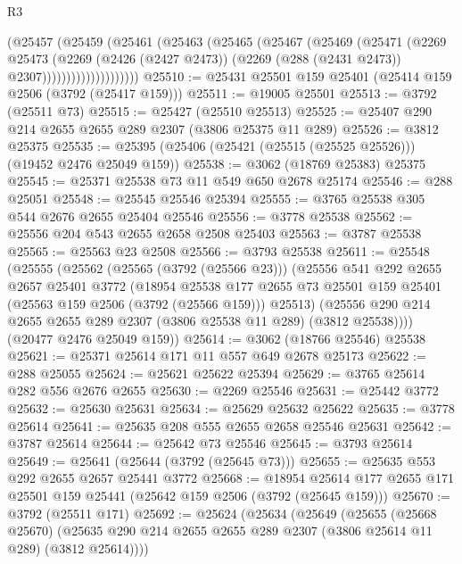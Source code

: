 \begin{lexlean}{R3}
\begin{coremodule}
                      (@25457
                        (@25459
                          (@25461
                            (@25463
                              (@25465
                                (@25467
                                  (@25469
                                    (@25471
                                      (@2269
                                        @25473
                                        (@2269
                                          (@2426 (@2427 @2473))
                                          (@2269 (@288 (@2431 @2473)) @2307))))))))))))))))))))
@25510 := @25431 @25501 @159 @25401 (@25414 @159 @2506 (@3792 (@25417 @159)))
@25511 := @19005 @25501
@25513 := @3792 (@25511 @73)
@25515 := @25427 (@25510 @25513)
@25525 := @25407 @290 @214 @2655 @2655 @289 @2307 (@3806 @25375 @11 @289)
@25526 := @3812 @25375
@25535 := @25395 (@25406 (@25421 (@25515 (@25525 @25526))) (@19452 @2476 @25049 @159))
@25538 := @3062 (@18769 @25383) @25375
@25545 := @25371 @25538 @73 @11 @549 @650 @2678 @25174
@25546 := @288 @25051
@25548 := @25545 @25546 @25394
@25555 := @3765 @25538 @305 @544 @2676 @2655 @25404 @25546
@25556 := @3778 @25538
@25562 := @25556 @204 @543 @2655 @2658 @2508 @25403
@25563 := @3787 @25538
@25565 := @25563 @23 @2508
@25566 := @3793 @25538
@25611 := @25548
    (@25555
      (@25562
        (@25565 (@3792 (@25566 @23)))
        (@25556
          @541
          @292
          @2655
          @2657
          @25401
          @3772
          (@18954
            @25538
            @177
            @2655
            @73
            @25501
            @159
            @25401
            (@25563 @159 @2506 (@3792 (@25566 @159)))
            @25513)
          (@25556 @290 @214 @2655 @2655 @289 @2307 (@3806 @25538 @11 @289) (@3812 @25538))))
      (@20477 @2476 @25049 @159))
@25614 := @3062 (@18766 @25546) @25538
@25621 := @25371 @25614 @171 @11 @557 @649 @2678 @25173
@25622 := @288 @25055
@25624 := @25621 @25622 @25394
@25629 := @3765 @25614 @282 @556 @2676 @2655
@25630 := @2269 @25546
@25631 := @25442 @3772
@25632 := @25630 @25631
@25634 := @25629 @25632 @25622
@25635 := @3778 @25614
@25641 := @25635 @208 @555 @2655 @2658 @25546 @25631
@25642 := @3787 @25614
@25644 := @25642 @73 @25546
@25645 := @3793 @25614
@25649 := @25641 (@25644 (@3792 (@25645 @73)))
@25655 := @25635 @553 @292 @2655 @2657 @25441 @3772
@25668 := @18954 @25614 @177 @2655 @171 @25501 @159 @25441 (@25642 @159 @2506 (@3792 (@25645 @159)))
@25670 := @3792 (@25511 @171)
@25692 := @25624
    (@25634
      (@25649
        (@25655
          (@25668 @25670)
          (@25635 @290 @214 @2655 @2655 @289 @2307 (@3806 @25614 @11 @289) (@3812 @25614))))

\end{coremodule}
\end{lexlean}

